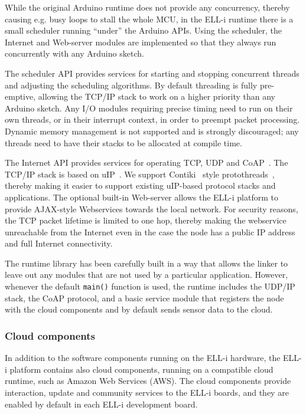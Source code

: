 \documentclass{siamltex}
\begin{document}
While the original Arduino runtime does not provide any concurrency,
thereby causing e.g. busy loops to stall the whole MCU, in the ELL-i
runtime there is a small scheduler running ``under'' the Arduino
APIs.  Using the scheduler, the Internet and Web-server modules are
implemented so that they always run concurrently with any Arduino
sketch.  %

The scheduler API provides services for starting and stopping concurrent
threads and adjusting the scheduling algorithms.  By default threading
is fully pre-emptive, allowing the TCP/IP stack to work on a higher
priority than any Arduino sketch.  Any I/O modules requiring precise
timing need to run on their own threads, or in their interrupt
context, in order to preempt packet processing.  Dynamic memory
management is not supported and is strongly discouraged; any threads
need to have their stacks to be allocated at compile time.

The Internet API provides services for operating TCP, UDP and
CoAP~\cite{shelby2013constrained}.  The TCP/IP stack is based on
uIP~\cite{dunkels2003full}.  We support Contiki~\cite{dunkels2004contiki}
style protothreads~\cite{dunkels2006protothreads}, thereby making it easier to
support existing uIP-based protocol stacks and applications.
The optional built-in Web-server allows the ELL-i platform to provide
AJAX-style Webservices towards the local network.  For security
reasons, the TCP packet lifetime is limited to one hop, thereby making
the webservice unreachable from the Internet even in the case the node
has a public IP address and full Internet connectivity.

The runtime library has been carefully built in a way that allows the
linker to leave out any modules that are not used by a particular
application.  However, whenever the default \hbox{\tt main()} function
is used, the runtime includes the UDP/IP stack, the CoAP protocol, and
a basic service module that registers the node with the cloud
components and by default sends sensor data to the cloud.

\subsubsection{Cloud components}

In addition to the software components running on the ELL-i hardware,
the ELL-i platform contains also cloud components, running on a
compatible cloud runtime, such as Amazon Web Services (AWS).
The cloud components provide interaction, update and community
services to the ELL-i boards, and they are enabled by default in each
ELL-i development board.
\end{document}
